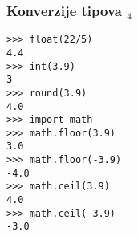 \documentclass[utf8,compress]{beamer}
\begin{document}

\begin{frame}[fragile]
  \frametitle{Konverzije tipova $_4$}
\begin{verbatim}
>>> float(22/5)
4.4
>>> int(3.9)
3
>>> round(3.9)
4.0
>>> import math
>>> math.floor(3.9)
3.0
>>> math.floor(-3.9)
-4.0
>>> math.ceil(3.9)
4.0
>>> math.ceil(-3.9)
-3.0
\end{verbatim}
\end{frame}
\end{document}
